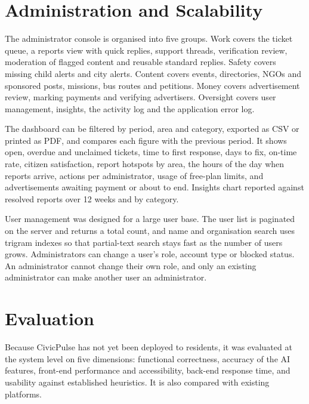 \documentclass[conference]{IEEEtran}
\begin{document}
\section{Administration and Scalability}
The administrator console is organised into five groups. Work covers the ticket queue, a reports view with quick replies, support threads, verification review, moderation of flagged content and reusable standard replies. Safety covers missing child alerts and city alerts. Content covers events, directories, NGOs and sponsored posts, missions, bus routes and petitions. Money covers advertisement review, marking payments and verifying advertisers. Oversight covers user management, insights, the activity log and the application error log.

The dashboard can be filtered by period, area and category, exported as CSV or printed as PDF, and compares each figure with the previous period. It shows open, overdue and unclaimed tickets, time to first response, days to fix, on-time rate, citizen satisfaction, report hotspots by area, the hours of the day when reports arrive, actions per administrator, usage of free-plan limits, and advertisements awaiting payment or about to end. Insights chart reported against resolved reports over 12 weeks and by category.

User management was designed for a large user base. The user list is paginated on the server and returns a total count, and name and organisation search uses trigram indexes so that partial-text search stays fast as the number of users grows. Administrators can change a user's role, account type or blocked status. An administrator cannot change their own role, and only an existing administrator can make another user an administrator.

\section{Evaluation}
Because CivicPulse has not yet been deployed to residents, it was evaluated at the system level on five dimensions: functional correctness, accuracy of the AI features, front-end performance and accessibility, back-end response time, and usability against established heuristics. It is also compared with existing platforms.
\end{document}
